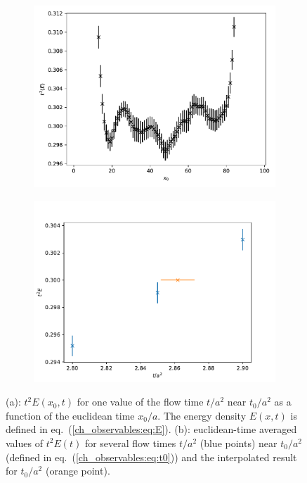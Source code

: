 \begin{figure}
    \begin{subfigure}{1.\textwidth}
    	\includegraphics[width=\textwidth]{./cap3/figs/t2E_vs_x0.pdf}
    	\caption{}
    \end{subfigure}
    \begin{subfigure}{1.\textwidth}
    	\includegraphics[width=\textwidth]{./cap3/figs/t2E_vs_t.pdf}
    	\caption{}
    \end{subfigure}
    \caption{(a): $t^2E(x_0,t)$ for one value of the flow time $t/a^2$ near $t_0/a^2$ as a function of the euclidean time $x_0/a$. The energy density $E(x,t)$ is defined in eq.~(\ref{ch_observables:eq:E}). (b): euclidean-time averaged values of $t^2E(t)$ for several flow times $t/a^2$ (blue points) near $t_0/a^2$ (defined in eq.~(\ref{ch_observables:eq:t0})) and the interpolated result for $t_0/a^2$ (orange point).}
        \label{ch_observables:fig:t2E}
\end{figure}

